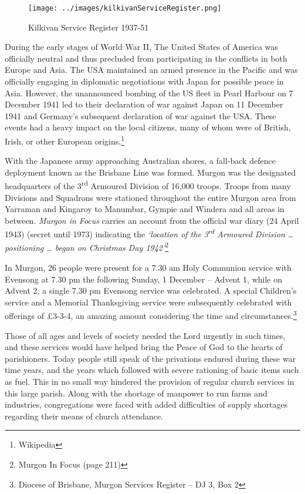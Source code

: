 \begin{figure}
\begin{center}
\texttt{[image: ../images/kilkivanServiceRegister.png]}
\caption{Kilkivan Service Register 1937-51}
\end{center}
\end{figure}




During the early stages of World War II, The United States of America was officially neutral and thus precluded from participating in the conflicts in both Europe and Asia. The USA maintained an armed presence in the Pacific and was officially engaging in diplomatic negotiations with Japan for possible peace in Asia. However, the unannounced bombing of the US fleet in Pearl Harbour on 7 December 1941 led to their declaration of war against Japan on 11 December 1941 and Germany's subsequent declaration of war against the USA. These events had a heavy impact on the local citizens, many of whom were of British, Irish, or other European origins.\footnote{Wikipedia}


With the Japanese army approaching Australian shores, a fall-back defence deployment known as the Brisbane Line was formed. Murgon was the designated headquarters of the 3\textsuperscript{rd} Armoured Division of 16,000 troops. Troops from many Divisions and Squadrons were stationed throughout the entire Murgon area from Yarraman and Kingaroy to Manumbar, Gympie and Windera and all areas in between. \emph{Murgon in Focus} carries an account from the official war diary (24 April 1943) (secret until 1973) indicating the \emph{`location of the 3\textsuperscript{rd} Armoured Division \ldots{} positioning \ldots{} began on Christmas Day 1942'}\footnote{Murgon In Focus (page 211)}


In Murgon, 26 people were present for a 7.30 am Holy Communion service with Evensong at 7.30 pm the following Sunday, 1 December -- Advent 1, while on Advent 2, a single 7.30 pm Evensong service was celebrated. A special Children's service and a Memorial Thanksgiving service were subsequently celebrated with offerings of \pounds3-3-4, an amazing amount considering the time and circumstances.\footnote{Diocese of Brisbane, Murgon Services Register -- DJ 3, Box 2}


Those of all ages and levels of society needed the Lord urgently in such times, and these services would have helped bring the Peace of God to the hearts of parishioners. Today people still speak of the privations endured during these war time years, and the years which followed with severe rationing of basic items such as fuel. This in no small way hindered the provision of regular church services in this large parish. Along with the shortage of manpower to run farms and industries, congregations were faced with added difficulties of supply shortages regarding their means of church attendance.



